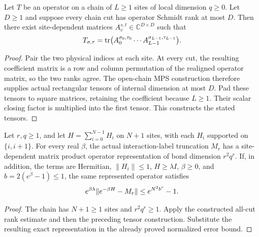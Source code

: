 \begin{lemma}
    \label{thm:operator_chain_from_all_cut_ranks}
    \leanok

    Let $T$ be an operator on a chain of $L\geq1$ sites of local
    dimension $q\geq0$. Let $D\geq1$ and suppose every chain cut
    has operator Schmidt rank at most $D$. Then there exist
    site-dependent matrices $A_v^{s,t}\in\mathbb C^{D\times D}$ such that
    \begin{align}
        T_{\sigma,\tau}
        =\operatorname{tr}\bigl(A_0^{\sigma_0,\tau_0}\cdots
             A_{L-1}^{\sigma_{L-1},\tau_{L-1}}\bigr).\notag
    \end{align}
\end{lemma}
\begin{proof}\leanok
    Pair the two physical indices at each site. At every cut, the
    resulting coefficient matrix is a row and column permutation
    of the realigned operator matrix, so the two ranks agree.
    The open-chain MPS construction therefore supplies actual
    rectangular tensors of internal dimension at most $D$.
    Pad these tensors to square matrices, retaining the coefficient
    because $L\geq1$. Their scalar closing factor is multiplied
    into the first tensor. This constructs the stated tensors.
\end{proof}

\begin{lemma}
    \label{thm:physical_cluster_label_mpo}
    \leanok

    Let $r,q\geq1$, and let $H=\sum_{i=0}^{N-1}H_i$ on $N+1$ sites,
    with each $H_i$ supported on $\{i,i+1\}$. For every real $\beta$,
    the actual interaction-label truncation $M_r$ has a site-dependent
    matrix product operator representation of bond dimension $r^2q^r$.
    If, in addition, the terms are Hermitian, $\|H_i\|\leq1$,
    $H\geq\lambda I$, $\beta\geq0$, and $b=2(e^\beta-1)\leq1$, the
    same represented operator satisfies
    \begin{align}
        e^{\beta\lambda}\|e^{-\beta H}-M_r\|
        \leq e^{N^2b^r}-1.\notag
    \end{align}
\end{lemma}
\begin{proof}\leanok
    The chain has $N+1\geq1$ sites and $r^2q^r\geq1$. Apply the
    constructed all-cut rank estimate and then the preceding tensor
    construction. Substitute the resulting exact representation in
    the already proved normalized error bound.
\end{proof}

